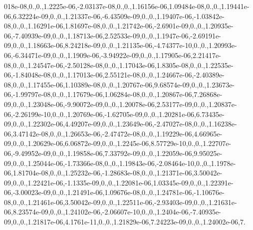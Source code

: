 \begin{DoxyCompactItemize}
018e-\/08,0.,0.,1.\-2225e-\/06,-\/2.\-03137e-\/08,0.,0.,1.\-16156e-\/06,1.\-09484e-\/08,0.,0.,1.\-19441e-\/06,6.\-32224e-\/09,0.,0.,1.\-21337e-\/06,-\/6.\-43509e-\/09,0.,0.,1.\-19407e-\/06,-\/1.\-03842e-\/08,0.,0.,1.\-16291e-\/06,1.\-81697e-\/08,0.,0.,1.\-21742e-\/06,-\/2.\-6901e-\/09,0.,0.,1.\-20935e-\/06,-\/7.\-40939e-\/09,0.,0.,1.\-18713e-\/06,2.\-52533e-\/09,0.,0.,1.\-1947e-\/06,-\/2.\-69191e-\/09,0.,0.,1.\-18663e-\/06,8.\-24218e-\/09,0.,0.,1.\-21135e-\/06,-\/4.\-74377e-\/10,0.,0.,1.\-20993e-\/06,-\/6.\-34471e-\/09,0.,0.,1.\-1909e-\/06,-\/3.\-94922e-\/09,0.,0.,1.\-17905e-\/06,2.\-21417e-\/08,0.,0.,1.\-24547e-\/06,-\/2.\-50128e-\/08,0.,0.,1.\-17043e-\/06,1.\-8305e-\/08,0.,0.,1.\-22535e-\/06,-\/1.\-84048e-\/08,0.,0.,1.\-17013e-\/06,2.\-55121e-\/08,0.,0.,1.\-24667e-\/06,-\/2.\-40389e-\/08,0.,0.,1.\-17455e-\/06,1.\-10389e-\/08,0.,0.,1.\-20767e-\/06,9.\-68574e-\/09,0.,0.,1.\-23673e-\/06,-\/1.\-99797e-\/08,0.,0.,1.\-17679e-\/06,1.\-06284e-\/08,0.,0.,1.\-20867e-\/06,7.\-26868e-\/09,0.,0.,1.\-23048e-\/06,-\/9.\-90072e-\/09,0.,0.,1.\-20078e-\/06,2.\-53177e-\/09,0.,0.,1.\-20837e-\/06,-\/2.\-26199e-\/10,0.,0.,1.\-20769e-\/06,-\/1.\-62705e-\/09,0.,0.,1.\-20281e-\/06,6.\-73435e-\/09,0.,0.,1.\-22302e-\/06,4.\-49207e-\/09,0.,0.,1.\-23649e-\/06,-\/2.\-47027e-\/08,0.,0.,1.\-16238e-\/06,3.\-47142e-\/08,0.,0.,1.\-26653e-\/06,-\/2.\-47472e-\/08,0.,0.,1.\-19229e-\/06,4.\-66965e-\/09,0.,0.,1.\-20629e-\/06,6.\-06872e-\/09,0.,0.,1.\-2245e-\/06,8.\-57729e-\/10,0.,0.,1.\-22707e-\/06,-\/9.\-49952e-\/09,0.,0.,1.\-19858e-\/06,7.\-33792e-\/09,0.,0.,1.\-22059e-\/06,9.\-95025e-\/09,0.,0.,1.\-25044e-\/06,-\/1.\-73366e-\/08,0.,0.,1.\-19843e-\/06,-\/2.\-08464e-\/10,0.,0.,1.\-1978e-\/06,1.\-81704e-\/08,0.,0.,1.\-25232e-\/06,-\/1.\-28683e-\/08,0.,0.,1.\-21371e-\/06,3.\-50042e-\/09,0.,0.,1.\-22421e-\/06,-\/1.\-1335e-\/09,0.,0.,1.\-22081e-\/06,1.\-03345e-\/09,0.,0.,1.\-22391e-\/06,-\/3.\-00023e-\/09,0.,0.,1.\-21491e-\/06,1.\-09676e-\/08,0.,0.,1.\-24781e-\/06,-\/1.\-10676e-\/08,0.,0.,1.\-21461e-\/06,3.\-50042e-\/09,0.,0.,1.\-22511e-\/06,-\/2.\-93403e-\/09,0.,0.,1.\-21631e-\/06,8.\-23574e-\/09,0.,0.,1.\-24102e-\/06,-\/2.\-06607e-\/10,0.,0.,1.\-2404e-\/06,-\/7.\-40935e-\/09,0.,0.,1.\-21817e-\/06,4.\-1761e-\/11,0.,0.,1.\-21829e-\/06,7.\-24223e-\/09,0.,0.,1.\-24002e-\/06,7.\-
\end{DoxyCompactItemize}
